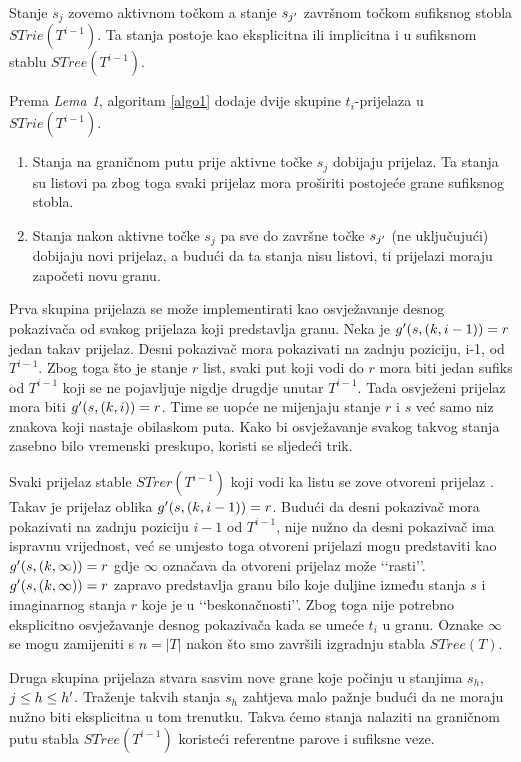 \documentclass[times, utf8, seminar, numeric]{fer}
\begin{document}
	Stanje $s_j$ zovemo aktivnom točkom  a stanje $s_{j\rq{}}$ završnom točkom  sufiksnog stobla $STrie(T^{i-1})$. Ta stanja postoje kao eksplicitna ili implicitna i u sufiksnom stablu $STree(T^{i-1})$. 
	
	Prema \textit{Lema 1}, algoritam \ref{algo1} dodaje dvije skupine $t_i$-prijelaza u $STrie(T^{i-1})$.

\begin{enumerate}
	\item Stanja na graničnom putu prije aktivne točke $s_j$ dobijaju prijelaz. Ta stanja su listovi pa zbog toga svaki prijelaz mora proširiti postojeće grane sufiksnog stobla.
	\item Stanja nakon aktivne točke $s_j$ pa sve do završne točke $s_{j\rq{}}$ (ne uključujući) dobijaju novi prijelaz, a budući da ta stanja nisu listovi, ti prijelazi moraju započeti novu granu.
\end{enumerate}

	Prva skupina prijelaza se može implementirati kao osvježavanje desnog pokazivača od svakog prijelaza koji predstavlja granu. Neka je $g\rq{}(s, (k, i-1)) = r$ jedan takav prijelaz. Desni pokazivač mora pokazivati na zadnju poziciju, i-1, od $T^{i-1}$. Zbog toga što je stanje $r$ list, svaki put koji vodi do $r$ mora biti jedan sufiks od $T^{i-1}$ koji se ne pojavljuje nigdje drugdje unutar $T^{i-1}$. Tada osvježeni prijelaz mora biti $g\rq{}(s, (k, i)) = r$. Time se uopće ne mijenjaju stanje $r$ i $s$ već samo niz znakova koji nastaje obilaskom puta. Kako bi osvježavanje svakog takvog stanja zasebno bilo vremenski preskupo, koristi se sljedeći trik.

	Svaki prijelaz stable $STrer(T^{i-1})$ koji vodi ka listu se zove otvoreni prijelaz . Takav je prijelaz oblika $g\rq{}(s, (k, i-1)) = r$. Budući da desni pokazivač mora pokazivati na zadnju poziciju $i-1$ od $T^{i-1}$, nije nužno da desni pokazivač ima ispravnu vrijednost, već se umjesto toga otvoreni prijelazi mogu predstaviti kao $g\rq{}(s, (k, \infty)) = r$ gdje $\infty$ označava da otvoreni prijelaz može \lq\lq{}rasti\rq\rq{}. $g\rq{}(s, (k, \infty)) = r$ zapravo predstavlja granu bilo koje duljine između stanja $s$ i imaginarnog stanja $r$ koje je u \lq\lq{}beskonačnosti\rq\rq{}. Zbog toga nije potrebno eksplicitno osvježavanje desnog pokazivača kada se umeće $t_i$ u granu. Oznake $\infty$ se mogu zamijeniti s $n = |T|$ nakon što smo završili izgradnju stabla $STree(T)$.
	
	Druga skupina prijelaza stvara sasvim nove grane koje počinju u stanjima $s_h$, $j \le h \le h\rq{}$. Traženje takvih stanja $s_h$ zahtjeva malo pažnje budući da ne moraju nužno biti eksplicitna u tom trenutku. Takva ćemo stanja nalaziti na graničnom putu stabla $STree(T^{i-1})$ koristeći referentne parove i sufiksne veze.
	
\end{document}
